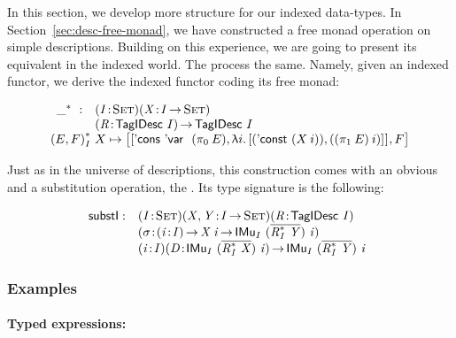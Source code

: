 In this section, we develop more structure for our indexed
data-types. In Section~\ref{sec:desc-free-monad}, we have constructed
a free monad operation on simple descriptions. Building on this
experience, we are going to present its equivalent in the indexed
world. The process the same. Namely, given an indexed functor, we
derive the indexed functor coding its free monad:

\[\stk{
\begin{array}{ll}
\FreeIMonad{\_}{} : & \PITEL{\V{I}}{\Set}
                      \PITEL{\V{X}}{\V{I} \To \Set} \\
                    & \PITEL{\V{R}}{\TagIDesc{I}} \To
                      \TagIDesc{I}
\end{array} \\
\FreeIMonad{(E,F)}{I}{X} \mapsto
    \pair{\pair{\ListCons{\DVar{}}{(\fst{E})}} 
               {\LAM{i}
                \pair{(\DConst{(X\: i)})}
                     {((\snd{E})\: i)}{}}{}}
         {F}{}
}\]

Just as in the universe of descriptions, this construction comes with
an obvious \return and a substitution operation, the \bind. Its type
signature is the following:

\newcommand{\substI}{\F{substI}}

\[
\begin{array}{@{}ll}
\substI : & \PITEL{\V{I}}{\Set}
            \PITEL{\V{X}, \V{Y}}{\V{I} \To \Set}
            \PITEL{\V{R}}{\TagIDesc{\V{I}}} \\
          & \PITEL{\V{\sigma}}{\PI{\V{i}}{\V{I}} \V{X}\:\V{i} \To 
                               \IMu{I}{(\toIDesc{\FreeIMonad{\V{R}}{\V{I}}{\V{Y}}})}{\V{i}}} \\
          & \PITEL{\V{i}}{\V{I}}
            \PITEL{\V{D}}{\IMu{I}{(\toIDesc{\FreeIMonad{\V{R}}{\V{I}}{\V{X}}})}{\V{i}}} \To
            \IMu{I}{(\toIDesc{\FreeIMonad{\V{R}}{\V{I}}{\V{Y}}})}{\V{i}}
\end{array}
\]


\subsubsection{Examples}

\paragraph{Typed expressions:}

